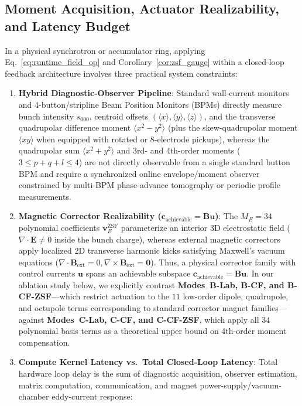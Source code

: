 \documentclass[11pt,a4paper]{article}
\begin{document}
\subsection{Moment Acquisition, Actuator Realizability, and Latency Budget}
In a physical synchrotron or accumulator ring, applying Eq.~\eqref{eq:runtime_field_op} and Corollary~\ref{cor:zsf_gauge} within a closed-loop feedback architecture involves three practical system constraints:
\begin{enumerate}
    \item \textbf{Hybrid Diagnostic-Observer Pipeline}: Standard wall-current monitors and 4-button/stripline Beam Position Monitors (BPMs) directly measure bunch intensity $s_{000}$, centroid offsets $(\langle x \rangle, \langle y \rangle, \langle z \rangle)$, and the transverse quadrupolar difference moment $\langle x^2 - y^2 \rangle$ (plus the skew-quadrupolar moment $\langle xy \rangle$ when equipped with rotated or 8-electrode pickups), whereas the quadrupolar sum $\langle x^2 + y^2 \rangle$ and 3rd- and 4th-order moments ($3 \le p+q+l \le 4$) are not directly observable from a single standard button BPM and require a synchronized online envelope/moment observer constrained by multi-BPM phase-advance tomography or periodic profile measurements.
    \item \textbf{Magnetic Corrector Realizability ($\bm{c}_{\mathrm{achievable}} = \bm{B}\bm{u}$)}: The $M_E = 34$ polynomial coefficients $\bm{v}_E^{\mathrm{ZSF}}$ parameterize an interior 3D electrostatic field ($\nabla\cdot\bm{E} \ne 0$ inside the bunch charge), whereas external magnetic correctors apply localized 2D transverse harmonic kicks satisfying Maxwell's vacuum equations ($\nabla\cdot\bm{B}_{\mathrm{ext}} = 0, \nabla\times\bm{B}_{\mathrm{ext}} = \bm{0}$). Thus, a physical corrector family with control currents $\bm{u}$ spans an achievable subspace $\bm{c}_{\mathrm{achievable}} = \bm{B}\bm{u}$. In our ablation study below, we explicitly contrast \textbf{Modes~B-Lab, B-CF, and B-CF-ZSF}---which restrict actuation to the $11$ low-order dipole, quadrupole, and octupole terms corresponding to standard corrector magnet families---against \textbf{Modes~C-Lab, C-CF, and C-CF-ZSF}, which apply all $34$ polynomial basis terms as a theoretical upper bound on 4th-order moment compensation.
    \item \textbf{Compute Kernel Latency vs.\ Total Closed-Loop Latency}: Total hardware loop delay is the sum of diagnostic acquisition, observer estimation, matrix computation, communication, and magnet power-supply/vacuum-chamber eddy-current response:

\end{enumerate}
\end{document}
